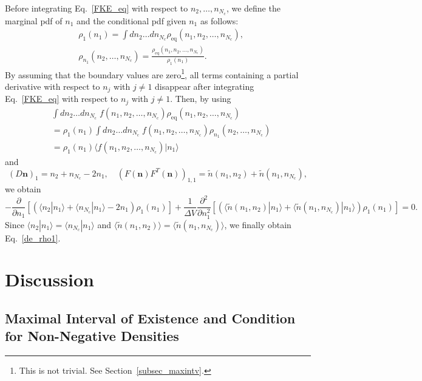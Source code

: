 \documentclass{article}
\newcommand{\dV}{{\Delta V}}
\newcommand{\Nc}{{N_\mathrm{c}}}
\begin{document}
Before integrating Eq.~\eqref{FKE_eq} with respect to $n_2,\dots,n_\Nc$, we define the marginal pdf of $n_1$ and the conditional pdf given $n_1$ as follows:
\begin{align}
&\rho_1(n_1)=\int d n_2 \dots d n_\Nc \rho_\mathrm{eq}(n_1,n_2,\dots,n_\Nc),\\
&\rho_{n_1}(n_2,\dots,n_\Nc)= \frac{\rho_\mathrm{eq}(n_1,n_2,\dots,n_\Nc)}{\rho_1(n_1)}.
\end{align}
By assuming that the boundary values are zero\footnote{This is not trivial. See Section~\ref{subsec_maxintv}.}, all terms containing a partial derivative with respect to $n_j$ with $j\ne1$ disappear after integrating Eq.~\eqref{FKE_eq} with respect to $n_j$ with $j\ne1$.
Then, by using
\begin{equation}
\begin{split}
&\int d n_2 \dots d n_\Nc\; f(n_1,n_2,\dots,n_\Nc)\rho_\mathrm{eq}(n_1,n_2,\dots,n_\Nc)\\
&=\rho_1(n_1)\int d n_2\dots d n_\Nc\; f(n_1,n_2,\dots,n_\Nc)\rho_{n_1}(n_2,\dots,n_\Nc)\\
&=\rho_1(n_1)\langle f(n_1,n_2,\dots,n_\Nc)|n_1\rangle
\end{split}
\end{equation}
and
\begin{equation}
(D\mathbf{n})_1 = n_2+n_\Nc-2n_1,\quad \left(F(\mathbf{n})F^T(\mathbf{n})\right)_{1,1}=\tilde{n}(n_1,n_2)+\tilde{n}(n_1,n_\Nc),
\end{equation}
we obtain 
\begin{equation}
-\frac{\partial}{\partial n_1}\left[\left(\langle n_2|n_1\rangle+\langle n_\Nc|n_1\rangle-2n_1\right)\rho_1(n_1)\right]
+\frac{1}{\dV}\frac{\partial^2}{\partial n_1^2}\left[\left(\langle\tilde{n}(n_1,n_2)|n_1\rangle+\langle\tilde{n}(n_1,n_\Nc)|n_1\rangle\right)\rho_1(n_1)\right]=0.
\end{equation}
Since $\langle n_2|n_1\rangle=\langle n_\Nc|n_1\rangle$ and $\langle\tilde{n}(n_1,n_2)\rangle=\langle\tilde{n}(n_1,n_\Nc)\rangle$, we finally obtain Eq.~\eqref{de_rho1}.

\section{\label{sec_discuss}Discussion}

\subsection{\label{subsec_maxintv}Maximal Interval of Existence and Condition for Non-Negative Densities}
\end{document}

